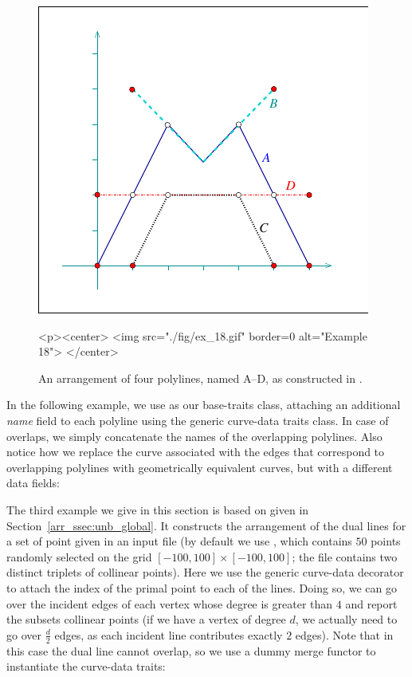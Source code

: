 
\begin{figure}[t]
\begin{ccTexOnly}
  \begin{center}
  \includegraphics{Arrangement_on_surface_2/fig/ex_18}
  \end{center}
\end{ccTexOnly}
\begin{ccHtmlOnly}
  <p><center>
  <img src="./fig/ex_18.gif" border=0 alt="Example 18">
  </center>
\end{ccHtmlOnly}
\caption{An arrangement of four polylines, named A--D, as
constructed in .\label{arr_fig:ex_18}}
\end{figure}

In the following example, we use  as
our base-traits class, attaching an additional {\em name} field to
each polyline using the generic curve-data traits class. In case of
overlaps, we simply concatenate the names of the overlapping
polylines. Also notice how we replace the curve associated with
the edges that correspond to overlapping polylines with 
geometrically equivalent curves, but with a different data fields:


The third example we give in this section is based on 
given in Section~\ref{arr_ssec:unb_global}. It constructs the arrangement
of the dual lines for a set of point given in an input file (by default we
use , which contains $50$ points randomly selected
on the grid $[-100,100]\times[-100,100]$; the file contains two distinct
triplets of collinear points). Here we use the generic curve-data
decorator to attach the index of the primal point to each of the lines.
Doing so, we can go over the incident edges of each vertex whose degree is
greater than $4$ and report the subsets collinear points (if we have a vertex
of degree $d$, we actually need to go over $\frac{d}{2}$ edges, as each
incident line contributes exactly $2$ edges). Note that in this case the
dual line cannot overlap, so we use a dummy merge functor to instantiate
the curve-data traits:

